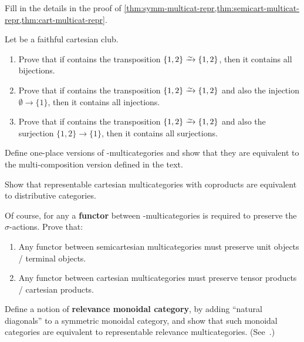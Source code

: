 \begin{ex}\label{ex:gen-multicat-repr}
  Fill in the details in the proof of \cref{thm:symm-multicat-repr,thm:semicart-multicat-repr,thm:cart-multicat-repr}.
\end{ex}

\begin{ex}\label{ex:club-generators}
  Let \fS be a faithful cartesian club.
  \begin{enumerate}
  \item Prove that if \fS contains the transposition $\{1,2\}\toiso \{1,2\}$, then it contains all bijections.
  \item Prove that if \fS contains the transposition $\{1,2\}\toiso \{1,2\}$ and also the injection $\emptyset \to \{1\}$, then it contains all injections.
  \item Prove that if \fS contains the transposition $\{1,2\}\toiso \{1,2\}$ and also the surjection $\{1,2\} \to \{1\}$, then it contains all surjections.
  \end{enumerate}
\end{ex}

\begin{ex}\label{ex:cartmulti-oneplace}
  Define one-place versions of \fS-multicategories and show that they are equivalent to the multi-composition version defined in the text.
\end{ex}

\begin{ex}\label{ex:distrib}
  Show that representable cartesian multicategories with coproducts are equivalent to distributive categories.
\end{ex}

\begin{ex}\label{ex:absolute}
  Of course, for any \fS a \textbf{functor} between \fS-multicategories is required to preserve the $\sigma$-actions.
  Prove that:
  \begin{enumerate}
  \item Any functor between semicartesian multicategories must preserve unit objects / terminal objects.
  \item Any functor between cartesian multicategories must preserve tensor products / cartesian products.
  \end{enumerate}
\end{ex}

\begin{ex}\label{ex:relevance-moncat}
  Define a notion of \textbf{relevance monoidal category}, by adding ``natural diagonals'' to a symmetric monoidal category, and show that such monoidal categories are equivalent to representable relevance multicategories.
  (See~\cite{dp:relevant-cats}.)
\end{ex}

